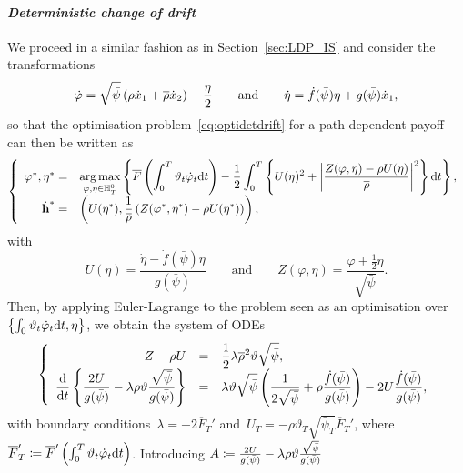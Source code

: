 \paragraph{\textit{Deterministic change of drift}}
We proceed in a similar fashion as in Section~\ref{sec:LDP_IS} and consider the  transformations
$$
\dot{\varphi} = \sqrt{\bar\psi}\left( \rho\dot{x}_1 + \overline{\rho}\dot{x}_2 \right) - \frac{\eta}{2} \qquad \text{and} \qquad \dot{\eta} = \dot{f}(\bar\psi)\eta + g(\bar\psi)\dot{x}_1,
$$
so that the optimisation problem~\eqref{eq:optidetdrift} for a path-dependent payoff can then be written as
\begin{equation}\label{eq:optidetdriftapplication}
\left\{
\begin{array}{rl}
\varphi^{*}, \eta^{*} = & \displaystyle  \operatorname*{arg\,max}\limits_{\varphi,\eta \in \mathbb{H}_T^0} \left\{ \overline{F}\left(\int_0^T \vartheta_t \dot{\varphi}_t \mathrm{d} t \right) 
- \frac{1}{2}\int_0^T \left\{U(\eta)^2 + \left|\frac{Z(\varphi,\eta) - \rho U(\eta)}{\overline{\rho}}\right|^2\right \}\mathrm{d} t \right\},\\
\dot{\boldsymbol{\mathrm{h}}}^{*}  = & \displaystyle 
\left(U(\eta^{*}),  \frac{1}{\overline{\rho}}\left(Z(\varphi^{*}, \eta^{*}) - \rho U(\eta^{*})\right)\right),
\end{array}
\right.
\end{equation}
with
$$
U(\eta) = \frac{\dot{\eta} - \dot{f}(\bar\psi)\eta}{g(\bar\psi)}
\qquad\text{and}\qquad
Z(\varphi, \eta) = \frac{\dot{\varphi} + \frac{1}{2}\eta}{\sqrt{\bar\psi}}. 
$$
Then, by applying Euler-Lagrange to the problem seen as an optimisation over~$\left \{\int_0^\cdot \vartheta_t\dot{\varphi}_t\mathrm{d} t,\eta\right \}$, we obtain the system of ODEs
\begin{equation*}
\left\{
\begin{array}{rcl}
Z - \rho U &=& \displaystyle \frac{1}{2}\lambda\overline{\rho}^2\vartheta \sqrt{\bar\psi},\\
\displaystyle \frac{\mathrm{d}}{\mathrm{d} t}\left\{\frac{2U}{g(\bar\psi)} - \lambda \rho \vartheta \frac{\sqrt{\bar\psi}}{g(\bar\psi)}\right\} &=& \displaystyle \lambda \vartheta \sqrt{\bar\psi} \left(\frac{1}{2\sqrt{\bar\psi}} + \rho \frac{\dot{f}(\bar\psi)}{g(\bar\psi)} \right) -2U\frac{\dot{f}(\bar\psi)}{g(\bar\psi)},
\end{array}
\right.
\end{equation*}
with boundary conditions~$\lambda = - 2\overline{F}_T'$ and~$U_T = -\rho\vartheta_T\sqrt{\bar\psi_T}\overline{F}_T'$, where~$\overline{F}_T'\coloneqq \overline{F}'\left(\int_0^T\vartheta_t\dot{\varphi}_t\mathrm{d} t\right)$. 
Introducing
$A \coloneqq \frac{2U}{g(\bar\psi)} - \lambda \rho \vartheta \frac{\sqrt{\bar\psi}}{g(\bar\psi)}$
